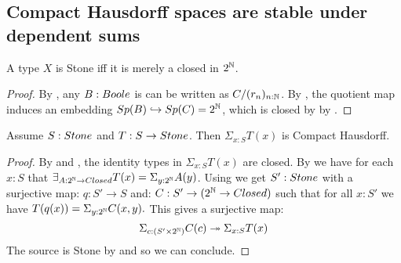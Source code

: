\subsection{Compact Hausdorff spaces are stable under dependent sums}

\begin{lemma}\label{StoneAsClosedSubsetOfCantor}
A type $X$ is Stone iff it is merely a closed in $2^{\mathbb{N}}$.
\end{lemma}
\begin{proof}
  By , any $B:\Boole$ is can be written as $C/(r_n)_{n:\mathbb{N}}$.
  By , the quotient map induces an embedding $Sp(B)\hookrightarrow Sp(C)= 2^{\mathbb{N}}$, 
  which is closed by 
  by .
\end{proof}

%
\begin{lemma}\label{SigmaStoneCompactHausdorff}
Assume $S:\Stone$ and $T:S\to \Stone$. Then $\Sigma_{x:S}T(x)$ is Compact Hausdorff.
\end{lemma}

\begin{proof}
  By  and , the identity types in $\Sigma_{x:S}T(x)$ are closed.
  By  %
%
  we have for each $x:S$ that 
  $\exists_{A:2^\N\to \Closed} T(x) = \Sigma_{y:2^\N}A(y)$. 
  Using  we get $S':\Stone$ with a surjective map:
  $q:S'\to S$ 
and:
$ C : S'\to (2^\N\to\Closed)$
  such that for all $x:S'$ we have 
  $T(q(x)) = \Sigma_{y:2^{\mathbb{N}}}C(x,y).$
This gives a surjective map:
$$ \Sigma_{c:(S'\times 2^{\mathbb{N}})}C(c)\twoheadrightarrow \Sigma_{x:S}T(x)$$
The source is Stone by  and  so we can conclude.
\end{proof}

